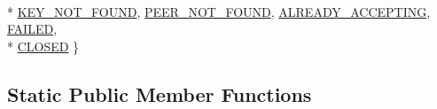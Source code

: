 \begin{DoxyCompactItemize}
\\*
\hyperlink{class_s_a_m_1_1_message_a5f7e317defb90f107fc1a017a4552ae9afd3f5c321f37a123533b0fabe2649d81}{K\+E\+Y\+\_\+\+N\+O\+T\+\_\+\+F\+O\+U\+N\+D}, 
\hyperlink{class_s_a_m_1_1_message_a5f7e317defb90f107fc1a017a4552ae9adae6ecb2a1136183a3772520c4972725}{P\+E\+E\+R\+\_\+\+N\+O\+T\+\_\+\+F\+O\+U\+N\+D}, 
\hyperlink{class_s_a_m_1_1_message_a5f7e317defb90f107fc1a017a4552ae9a651ae8ccc399e4729f54f3a75cdd6eea}{A\+L\+R\+E\+A\+D\+Y\+\_\+\+A\+C\+C\+E\+P\+T\+I\+N\+G}, 
\hyperlink{class_s_a_m_1_1_message_a5f7e317defb90f107fc1a017a4552ae9a7663a39eb51bdbc6e1156f4f69d96b51}{F\+A\+I\+L\+E\+D}, 
\\*
\hyperlink{class_s_a_m_1_1_message_a5f7e317defb90f107fc1a017a4552ae9af38e7a84d2781c4938c84f6c69084070}{C\+L\+O\+S\+E\+D}
 \}
\end{DoxyCompactItemize}
\subsection*{Static Public Member Functions}
